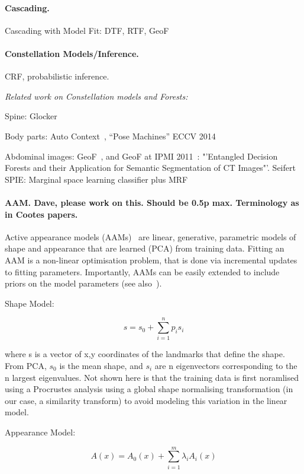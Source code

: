 \documentclass[10pt,twocolumn,letterpaper]{article}
\begin{document}
\paragraph{Cascading. }

Cascading with Model Fit: DTF, RTF, GeoF

\paragraph{Constellation Models/Inference. }
CRF, probabilistic inference.

\emph{Related work on Constellation models and Forests: }

Spine: Glocker~\cite{Glocker2013}

Body parts: Auto Context~\cite{AutoContext2008}, "`Pose Machines"' ECCV 2014~\cite{PoseMachinesECCV2014}

Abdominal images: GeoF~\cite{GeoForests2013}, and GeoF at IPMI 2011~\cite{CriminisiAbdominalIPMI2011}: "'Entangled Decision Forests and their Application for Semantic Segmentation of CT Images"'. Seifert SPIE: Marginal space learning classifier plus MRF~\cite{SeifertAnatomicalSPIE2009} 

\paragraph{AAM. Dave, please work on this. Should be 0.5p max. Terminology as in Cootes papers.}
Active appearance models (AAMs)~\cite{CootesAAM2001} are linear, generative, parametric models of shape and appearance that are learned (PCA) from training data.  Fitting an AAM is a non-linear optimisation problem, that is done via incremental updates to fitting parameters.  Importantly, AAMs can be easily extended to include priors on the model parameters (see also~\cite{BakerAAM2004}).  

Shape Model:

\[s = s_0 + \sum_{i=1}^n p_i s_i\]

where s is a vector of x,y coordinates of the landmarks that define the shape.  From PCA, $s_0$ is the mean shape, and $s_i$ are n eigenvectors corresponding to the n largest eigenvalues.  Not shown here is that the training data is first noramlised using a Procrustes analysis using a global shape normalising transformation (in our case, a similarity transform) to avoid modeling this variation in the linear model.

Appearance Model:

\[A(x) = A_0(x) + \sum_{i=1}^m \lambda_i A_i(x)\]
\end{document}
